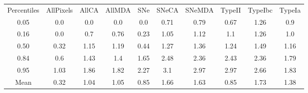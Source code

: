 \begin{table}
\begin{tabular}{cccccccccc}
Percentiles & AllPixels & AllCA & AllMDA & SNe & SNeCA & SNeMDA & TypeII & TypeIbc & TypeIa \\
0.05 & 0.0 & 0.0 & 0.0 & 0.0 & 0.71 & 0.79 & 0.67 & 1.26 & 0.9 \\
0.16 & 0.0 & 0.7 & 0.76 & 0.23 & 1.05 & 1.12 & 1.1 & 1.26 & 1.0 \\
0.50 & 0.32 & 1.15 & 1.19 & 0.44 & 1.27 & 1.36 & 1.24 & 1.49 & 1.16 \\
0.84 & 0.6 & 1.43 & 1.4 & 1.65 & 2.48 & 2.36 & 2.43 & 2.36 & 1.79 \\
0.95 & 1.03 & 1.86 & 1.82 & 2.27 & 3.1 & 2.97 & 2.97 & 2.66 & 1.83 \\
Mean & 0.32 & 1.04 & 1.05 & 0.85 & 1.66 & 1.63 & 0.85 & 1.73 & 1.38 \\
\end{tabular}
\end{table}
